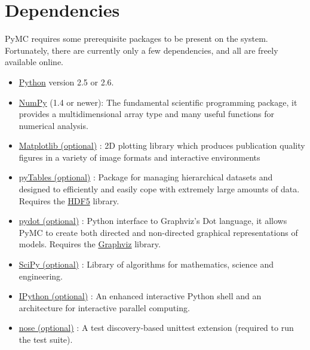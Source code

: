 \documentclass[letterpaper,10pt,english]{sphinxmanual}
\begin{document}
\section{Dependencies}
\label{INSTALL:dependencies}
PyMC requires some prerequisite packages to be present on the system.
Fortunately, there are currently only a few dependencies, and all are
freely available online.
\begin{itemize}
\item {} 
\href{http://www.python.org/.}{Python} version 2.5 or 2.6.

\item {} 
\href{http://www.scipy.org/NumPy}{NumPy} (1.4 or newer): The fundamental scientific programming package, it provides a
multidimensional array type and many useful functions for numerical analysis.

\item {} 
\href{http://matplotlib.sourceforge.net/}{Matplotlib (optional)} : 2D plotting library which produces publication
quality figures in a variety of image formats and interactive environments

\item {} 
\href{http://www.pytables.org/moin}{pyTables (optional)} : Package for managing hierarchical datasets and
designed to efficiently and easily cope with extremely large amounts of data.
Requires the \href{http://www.hdfgroup.org/HDF5/}{HDF5} library.

\item {} 
\href{http://code.google.com/p/pydot/}{pydot (optional)} : Python interface to Graphviz's Dot language, it allows
PyMC to create both directed and non-directed graphical representations of models.
Requires the \href{http://www.graphviz.org/}{Graphviz} library.

\item {} 
\href{http://www.scipy.org/}{SciPy (optional)} : Library of algorithms for mathematics, science
and engineering.

\item {} 
\href{http://ipython.scipy.org/}{IPython (optional)} : An enhanced interactive Python shell and an
architecture for interactive parallel computing.

\item {} 
\href{http://somethingaboutorange.com/mrl/projects/nose/}{nose (optional)} : A test discovery-based unittest extension (required
to run the test suite).

\end{itemize}
\end{document}
